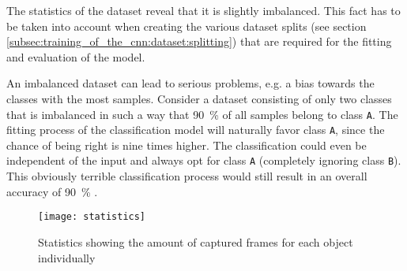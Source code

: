 The statistics of the dataset reveal that it is slightly imbalanced.
This fact has to be taken into account when creating the various dataset splits (see section \ref{subsec:training_of_the_cnn:dataset:splitting}) that are required for the fitting and evaluation of the model.

An imbalanced dataset can lead to serious problems, e.g. a bias towards the classes with the most samples.
Consider a dataset consisting of only two classes that is imbalanced in such a way that \SI{90}{\percent} of all samples belong to class \texttt{A}.
The fitting process of the classification model will naturally favor class \texttt{A}, since the chance of being right is nine times higher.
The classification could even be independent of the input and always opt for class \texttt{A} (completely ignoring class \texttt{B}).
This obviously terrible classification process would still result in an overall accuracy of \SI{90}{\percent} \cite{}. %


\begin{figure}
  \centering
  \texttt{[image: statistics]}
  \caption{Statistics showing the amount of captured frames for each object individually}
  \label{fig:statistics}
\end{figure}






















